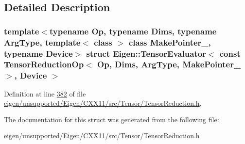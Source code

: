 \subsection{Detailed Description}
\subsubsection*{template$<$typename Op, typename Dims, typename Arg\+Type, template$<$ class $>$ class Make\+Pointer\+\_\+, typename Device$>$\newline
struct Eigen\+::\+Tensor\+Evaluator$<$ const Tensor\+Reduction\+Op$<$ Op, Dims, Arg\+Type, Make\+Pointer\+\_\+ $>$, Device $>$}



Definition at line \hyperlink{eigen_2unsupported_2_eigen_2_c_x_x11_2src_2_tensor_2_tensor_reduction_8h_source_l00382}{382} of file \hyperlink{eigen_2unsupported_2_eigen_2_c_x_x11_2src_2_tensor_2_tensor_reduction_8h_source}{eigen/unsupported/\+Eigen/\+C\+X\+X11/src/\+Tensor/\+Tensor\+Reduction.\+h}.



The documentation for this struct was generated from the following file\+:\begin{DoxyCompactItemize}
\item 
eigen/unsupported/\+Eigen/\+C\+X\+X11/src/\+Tensor/\+Tensor\+Reduction.\+h\end{DoxyCompactItemize}
